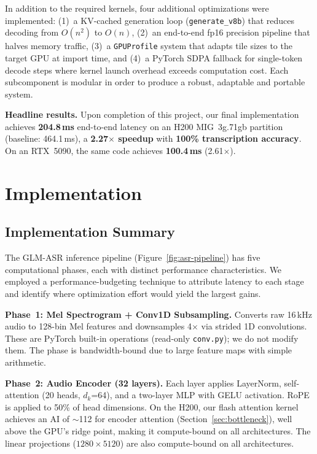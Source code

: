 \documentclass{article}
\begin{document}
In addition to the required kernels, four additional optimizations were implemented: (1)~a KV-cached generation loop (\texttt{generate\_v8b}) that reduces decoding from $O(n^2)$ to $O(n)$, (2)~an end-to-end fp16 precision pipeline that halves memory traffic, (3)~a \texttt{GPUProfile} system that adapts tile sizes to the target GPU at import time, and (4)~a PyTorch SDPA fallback for single-token decode steps where kernel launch overhead exceeds computation cost.
Each subcomponent is modular in order to produce a robust, adaptable and portable system.

\textbf{Headline results.}  Upon completion of this project, our final implementation achieves \textbf{204.8\,ms} end-to-end latency on an H200 MIG~3g.71gb partition (baseline: 464.1\,ms), a \textbf{2.27$\times$ speedup} with \textbf{100\% transcription accuracy}.  On an RTX~5090, the same code achieves \textbf{100.4\,ms} (2.61$\times$).


\section{Implementation}\label{sec:implementation}

\subsection{Implementation Summary}

The GLM-ASR inference pipeline (Figure~\ref{fig:asr-pipeline}) has five computational phases, each with distinct performance characteristics.
We employed a performance-budgeting technique to attribute latency to each stage and identify where optimization effort would yield the largest gains.

\textbf{Phase~1: Mel Spectrogram + Conv1D Subsampling.}
Converts raw 16\,kHz audio to 128-bin Mel features and downsamples 4$\times$ via strided 1D convolutions.  These are PyTorch built-in operations (read-only \texttt{conv.py}); we do not modify them.  The phase is bandwidth-bound due to large feature maps with simple arithmetic.

\textbf{Phase~2: Audio Encoder (32 layers).}
Each layer applies LayerNorm, self-attention (20 heads, $d_k$=64), and a two-layer MLP with GELU activation.  RoPE~\citep{su2024roformer} is applied to 50\% of head dimensions.  On the H200, our flash attention kernel achieves an AI of $\sim$112 for encoder attention (Section~\ref{sec:bottleneck}), well above the GPU's ridge point, making it compute-bound on all architectures.  The linear projections ($1280 \times 5120$) are also compute-bound on all architectures.
\end{document}
